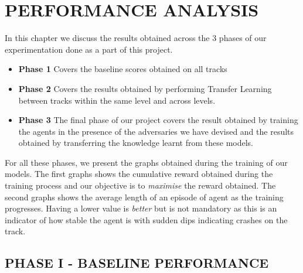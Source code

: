 
\chapter{PERFORMANCE ANALYSIS}

In this chapter we discuss the results obtained across the 3 phases of our experimentation done as a part of this project.
\begin{itemize}
    \item \textbf{Phase 1} Covers the baseline scores obtained on all tracks
    \item \textbf{Phase 2} Covers   the results obtained by performing Transfer Learning between tracks within the same level and across levels.
    \item \textbf{Phase 3} The final phase of our project covers the result obtained by training the agents in the presence of the adversaries we have devised and the results obtained by transferring the knowledge learnt from these models.
\end{itemize}

For all these phases, we present the graphs obtained during the training of our models. The first graphs shows the cumulative reward obtained during the training process and our objective is to \textit{maximise} the reward obtained. The second graphs shows the average length of an episode of agent as the training progresses. Having a lower value is \textit{better} but is not mandatory as this is an indicator of how stable the agent is with sudden dips indicating crashes on the track.

\section{PHASE I - BASELINE PERFORMANCE}

